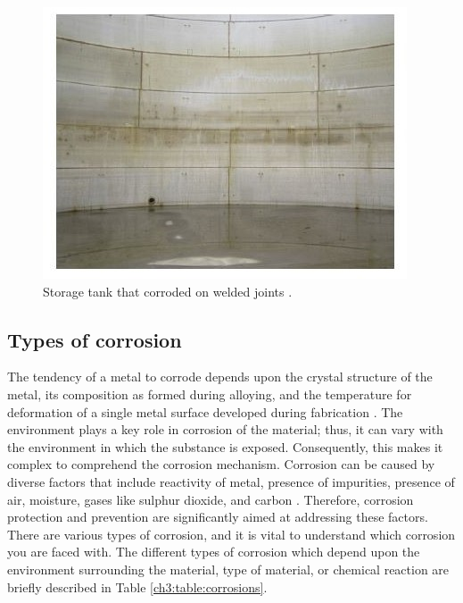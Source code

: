 \documentclass[12pt]{report}
\begin{document}
\begin{figure}[H]
    \centering
    \includegraphics[width=.55\textwidth]{storage_tank.jpg}
    \caption{Storage tank that corroded on welded joints \cite{karayan2014weld}.}
    \label{ch3:figure:tank}
\end{figure}

\subsection{Types of corrosion} 
The tendency of a metal to corrode depends upon the crystal structure of the metal, its composition as formed during alloying, and the temperature for deformation of a single metal surface developed during fabrication \cite{sourmail2005stainless}. The environment plays a key role in corrosion of the material; thus, it can vary with the environment in which the substance is exposed. Consequently, this makes it complex to comprehend the corrosion mechanism. Corrosion can be caused by diverse factors that include reactivity of metal, presence of impurities, presence of air, moisture, gases like sulphur dioxide, and carbon \cite{sourmail2005stainless}. Therefore, corrosion protection and prevention are significantly aimed at addressing these factors. There are various types of corrosion, and it is vital to understand which corrosion you are faced with. The different types of corrosion which depend upon the environment surrounding the material, type of material, or chemical reaction are briefly described in Table \ref{ch3:table:corrosions}.
\end{document}
